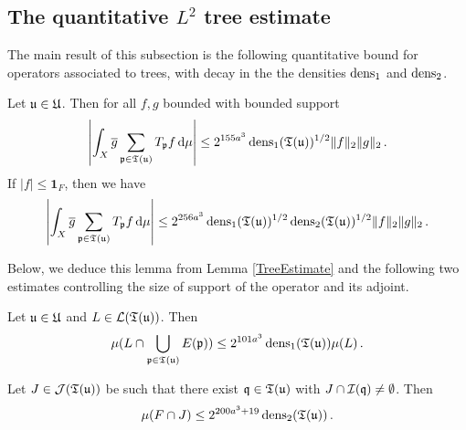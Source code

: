 {\subsection{The quantitative \texorpdfstring{$L^2$}{L2} tree estimate}

The main result of this subsection is the following quantitative bound for operators associated to trees, with decay in the the densities $\operatorname{\operatorname{dens}}_1$ and $\operatorname{\operatorname{dens}}_2$.

\begin{lemma}
    \label{lem tree est}
    Let $\mathfrak u \in \mathfrak U$. Then for all $f,g$ bounded with bounded support
    \begin{equation}
        \label{eq cor tree est}
        \left|\int_X \overline g \sum_{\mathfrak p \in \mathfrak T(\mathfrak u)} T_{\mathfrak p }f \, \mathrm{d}\mu \right| \le  2^{155a^3} \operatorname{\operatorname{dens}}_1(\mathfrak T(\mathfrak u))^{1/2} \|f\|_2\|g\|_2\,.
    \end{equation}
    If $|f| \le \mathbf{1}_F$, then we have
    \begin{equation}
        \label{eq cor tree est F}
        \left| \int_X \overline g \sum_{\mathfrak p \in \mathfrak T(\mathfrak u)} T_{\mathfrak p }f\, \mathrm{d}\mu \right| \le  2^{256a^3} \operatorname{\operatorname{dens}}_1(\mathfrak T(\mathfrak u))^{1/2} \operatorname{\operatorname{dens}}_2(\mathfrak T(\mathfrak u))^{1/2} \|f\|_2\|g\|_2\,.
    \end{equation}
\end{lemma}

Below, we deduce this lemma from  Lemma \ref{TreeEstimate} and the following two estimates controlling the size of support of the operator and its adjoint.

\begin{lemma}
    \label{lem 1density estimate tree}
    Let $\mathfrak u \in \mathfrak U$ and $L \in \mathcal{L}(\mathfrak T(\mathfrak u))$. Then
    \begin{equation}
    \label{eq 1density estimate tree}
        \mu(L \cap \bigcup_{\mathfrak p \in \mathfrak T(\mathfrak u)} E(\mathfrak p)) \le 2^{101a^3} \operatorname{\operatorname{dens}}_1(\mathfrak T(\mathfrak u)) \mu(L)\,.
    \end{equation}
\end{lemma}

\begin{lemma}
    \label{lem 2density estimate tree}
    Let $J \in \mathcal{J}(\mathfrak T(\mathfrak u))$ be such that there exist $\mathfrak q \in \mathfrak T(\mathfrak u)$ with $J \cap \mathcal{I}(\mathfrak q) \ne \emptyset$. Then
    $$
        \mu(F \cap J) \le 2^{200a^3 + 19} \operatorname{\operatorname{dens}}_2(\mathfrak T(\mathfrak u))\,.
    $$
\end{lemma}

}
